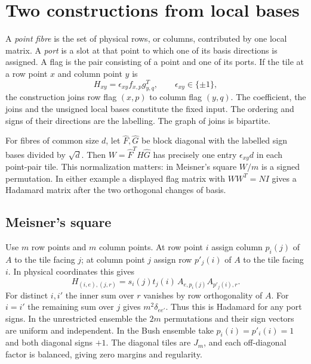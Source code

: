 \documentclass[11pt,reqno]{amsart}
\theoremstyle{remark}\newtheorem{remark}[theorem]{Remark}
\begin{document}
\section{Two constructions from local bases}\label{sec:construction}
A \emph{point fibre} is the set of physical rows, or columns, contributed by one local matrix. A \emph{port} is a slot at that point to which one of its basis directions is assigned. A flag is the pair consisting of a point and one of its ports. If the tile at a row point \(x\) and column point \(y\) is
\[
 H_{xy}=\epsilon_{xy}f_{x,p}g_{y,q}^{T},
 \qquad \epsilon_{xy}\in\{\pm1\},
\]
the construction joins row flag \((x,p)\) to column flag \((y,q)\). The coefficient, the joins and the unsigned local bases constitute the fixed input. The ordering and signs of their directions are the labelling. The graph of joins is bipartite.

For fibres of common size \(d\), let \(\widehat F,\widehat G\) be block diagonal with the labelled sign bases divided by \(\sqrt d\). Then \(W=\widehat F^T H\widehat G\) has precisely one entry \(\epsilon_{xy}d\) in each point-pair tile. This normalization matters: in Meisner's square \(W/m\) is a signed permutation. In either example a displayed flag matrix with \(WW^T=NI\) gives a Hadamard matrix after the two orthogonal changes of basis.

\subsection{Meisner's square}
Use \(m\) row points and \(m\) column points. At row point \(i\) assign column \(p_i(j)\) of \(A\) to the tile facing \(j\); at column point \(j\) assign row \(p'_j(i)\) of \(A\) to the tile facing \(i\). In physical coordinates this gives
\[
 H_{(i,e),(j,r)}
 =s_i(j)t_j(i)\,A_{e,p_i(j)} A_{p'_j(i),r}.
\]
For distinct \(i,i'\) the inner sum over \(r\) vanishes by row orthogonality of \(A\). For \(i=i'\) the remaining sum over \(j\) gives \(m^2\delta_{ee'}\). Thus this is Hadamard for any port signs. In the unrestricted ensemble the \(2m\) permutations and their sign vectors are uniform and independent. In the Bush ensemble take \(p_i(i)=p'_i(i)=1\) and both diagonal signs \(+1\). The diagonal tiles are \(J_m\), and each off-diagonal factor is balanced, giving zero margins and regularity.
\end{document}
